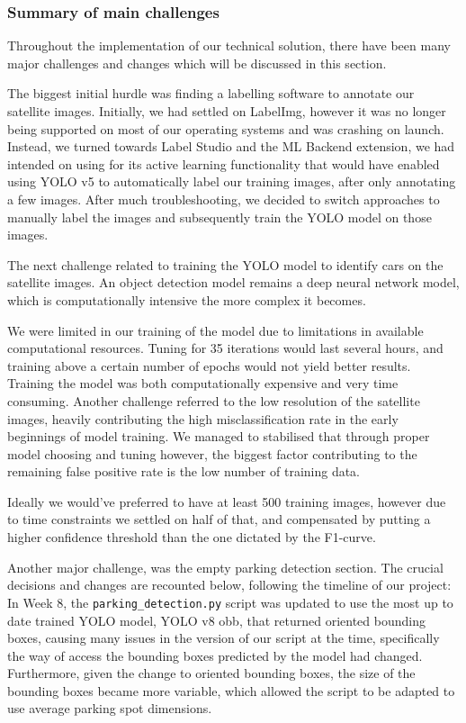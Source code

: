 \newpage{}

\subsubsection{Summary of main challenges}
Throughout the implementation of our technical solution, there have been many
major challenges and changes which will be discussed in this section.


The biggest initial hurdle was finding a labelling software to annotate our
satellite images. Initially, we had settled on LabelImg, however it was no
longer being supported on most of our operating systems and was crashing on
launch. Instead, we turned towards Label Studio and the ML Backend extension, we
had intended on using for its active learning functionality that would have
enabled using YOLO v5 to automatically label our training images, after only
annotating a few images. After much troubleshooting, we decided to switch
approaches to manually label the images and subsequently train the YOLO model on
those images.

The next challenge related to training the YOLO model to identify cars on the
satellite images. An object detection model remains a deep neural network model,
which is computationally intensive the more complex it becomes.

We were limited in our training of the model due to limitations in available
computational resources. Tuning for 35 iterations would last several hours, and
training above a certain number of epochs would not yield better results.
Training the model was both computationally expensive and very time consuming.
Another challenge referred to the low resolution of the satellite images,
heavily contributing the high misclassification rate in the early beginnings of
model training. We managed to stabilised that through proper model choosing and
tuning however, the biggest factor contributing to the remaining false positive
rate is the low number of training data.

Ideally we would've preferred to have at least 500 training images, however due
to time constraints we settled on half of that, and compensated by putting a
higher confidence threshold than the one dictated by the F1-curve.

Another major challenge, was the empty parking detection section. The crucial
decisions and changes are recounted below, following the timeline of our
project: \\
In Week 8, the \texttt{parking\_detection.py} script was updated to use the most
up to date trained YOLO model, YOLO v8 obb, that returned oriented bounding
boxes, causing many issues in the version of our script at the time,
specifically the way of access the bounding boxes predicted by the model had
changed. Furthermore, given the change to oriented bounding boxes, the size of
the bounding boxes became more variable, which allowed the script to be adapted
to use average parking spot dimensions.\\

